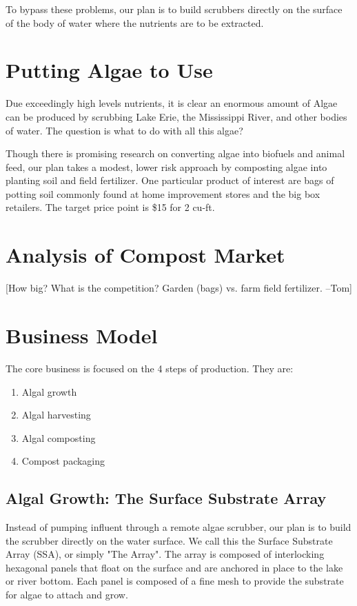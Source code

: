 \documentclass{article}
\newcommand{\tom}[1]{{\color{blue}[#1 --Tom]}}
\begin{document}
To bypass these problems, our plan is to build
scrubbers directly on the surface of the body of water
where the nutrients are to be extracted.

\section{Putting Algae to Use}

Due exceedingly high levels nutrients,
it is clear an enormous amount of Algae can be produced by scrubbing
Lake Erie, the Mississippi River, and other bodies of water.
The question is what to do with all this algae?

Though there is promising research on converting algae into biofuels
and animal feed,
our plan takes a modest, lower risk approach by composting algae into
planting soil and field fertilizer.
One particular product of interest are bags of potting soil
commonly found at home improvement stores and the big box retailers.
The target price point is \$15 for 2 cu-ft.

\section{Analysis of Compost Market}

\tom{How big?  What is the competition?  Garden (bags) vs. farm field fertilizer.}

\section{Business Model}

The core business is focused on the 4 steps of production.  They are:
\begin{enumerate}
  \item{Algal growth}
  \item{Algal harvesting}
  \item{Algal composting}
  \item{Compost packaging}
\end{enumerate}

\subsection{Algal Growth: The Surface Substrate Array}

Instead of pumping influent through a remote algae scrubber,
our plan is to build the scrubber directly on the water surface.
We call this the Surface Substrate Array (SSA), or simply "The Array".
The array is composed of interlocking hexagonal panels that
float on the surface and are anchored in place to the lake or river bottom.
Each panel is composed of a fine mesh to provide the substrate 
for algae to attach and grow.
\end{document}
